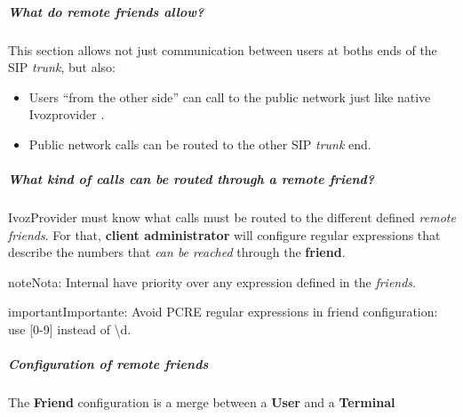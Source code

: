 \documentclass[letterpaper,10pt,spanish]{sphinxmanual}
\begin{document}
\subparagraph{What do remote friends allow?}
\label{administration_portal/client/vpbx/routing_endpoints/friends/remote_friends:what-do-remote-friends-allow}
This section allows not just communication between users at boths ends of the
SIP \emph{trunk}, but also:
\begin{itemize}
\item {} 
Users ``from the other side'' can call to the public network just like native
Ivozprovider {\hyperref[administration_portal/client/vpbx/users:users]{}}.

\item {} 
Public network calls can be routed to the other SIP \emph{trunk} end.

\end{itemize}


\subparagraph{What kind of calls can be routed through a \emph{remote friend}?}
\label{administration_portal/client/vpbx/routing_endpoints/friends/remote_friends:what-kind-of-calls-can-be-routed-through-a-remote-friend}
IvozProvider must know what calls must be routed to the different defined \emph{remote friends}.
For that, \textbf{client administrator} will configure regular expressions that
describe the numbers that \emph{can be reached} through the \textbf{friend}.

\begin{notice}{note}{Nota:}
Internal {\hyperref[administration_portal/client/vpbx/extensions:extensions]{}} have priority over any expression
defined in the \emph{friends}.
\end{notice}

\begin{notice}{important}{Importante:}
Avoid PCRE regular expressions in friend configuration: use {[}0-9{]} instead of \textbackslash{}d.
\end{notice}


\subparagraph{Configuration of remote friends}
\label{administration_portal/client/vpbx/routing_endpoints/friends/remote_friends:configuration-of-remote-friends}
The \textbf{Friend} configuration is a merge between a \textbf{User} and a \textbf{Terminal}
\end{document}
